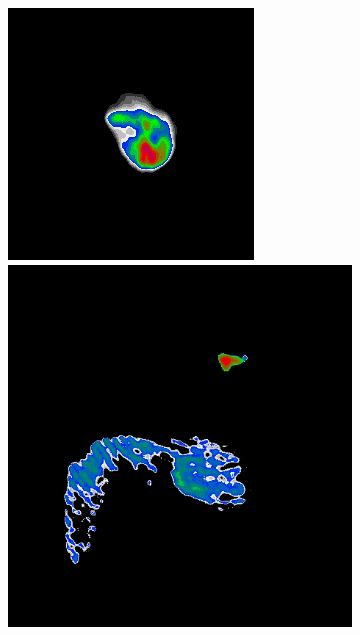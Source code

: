 \begin{figure}[h]
	\centering
	\begin{subfigure}[b]{0.3\linewidth}
		\includegraphics[width=1.00\linewidth]{./chapters/10.results/cleancomp/n132_cd.png}
		\\
		\includegraphics[width=1.00\linewidth]{./chapters/10.results/cleancomp/cd_calibration.png}

\end{subfigure}
\end{figure}
